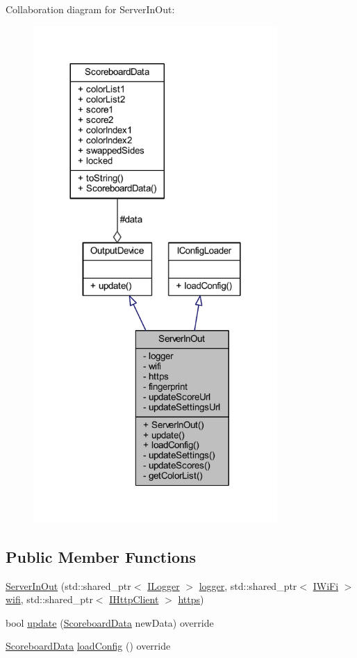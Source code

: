 Collaboration diagram for Server\+In\+Out\+:
\nopagebreak
\begin{figure}[H]
\begin{center}
\leavevmode
\includegraphics[width=263pt]{class_server_in_out__coll__graph}
\end{center}
\end{figure}
\subsection*{Public Member Functions}
\begin{DoxyCompactItemize}
\item 
\hyperlink{class_server_in_out_a15b30010007404ca8665bd07cd71cc86}{Server\+In\+Out} (std\+::shared\+\_\+ptr$<$ \hyperlink{class_i_logger}{I\+Logger} $>$ \hyperlink{class_server_in_out_a50c14553e627e15295eb3a0524478589}{logger}, std\+::shared\+\_\+ptr$<$ \hyperlink{class_i_wi_fi}{I\+Wi\+Fi} $>$ \hyperlink{class_server_in_out_abbaeaec2b3d84e8c4c62629cfd7c6b2c}{wifi}, std\+::shared\+\_\+ptr$<$ \hyperlink{class_i_http_client}{I\+Http\+Client} $>$ \hyperlink{class_server_in_out_a8a36805b52227548d216bd81a62f3abb}{https})
\item 
bool \hyperlink{class_server_in_out_a5442d5353fbf8445b7df75ee23c3322a}{update} (\hyperlink{struct_scoreboard_data}{Scoreboard\+Data} new\+Data) override
\item 
\hyperlink{struct_scoreboard_data}{Scoreboard\+Data} \hyperlink{class_server_in_out_a0525bb536f865858156f5d1527fcaeb6}{load\+Config} () override
\end{DoxyCompactItemize}
